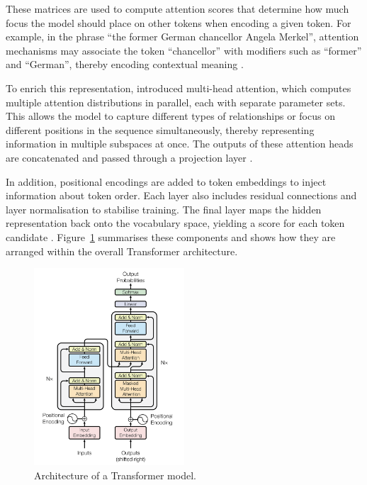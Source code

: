 \documentclass[a4paper,oneside,bibliography=totoc]{scrbook}
\begin{document}
These matrices are used to compute attention scores that determine how much focus the model should place on other tokens when encoding a given token. For example, in the phrase \enquote{the former German chancellor Angela Merkel}, attention mechanisms may associate the token \enquote{chancellor} with modifiers such as \enquote{former} and \enquote{German}, thereby encoding contextual meaning \cite{Sanderson2024}.

To enrich this representation, \citet{Vaswani2023} introduced multi-head attention, which computes multiple attention distributions in parallel, each with separate parameter sets. This allows the model to capture different types of relationships or focus on different positions in the sequence simultaneously, thereby representing information in multiple subspaces at once. The outputs of these attention heads are concatenated and passed through a projection layer \cite{Vaswani2023}.

In addition, positional encodings are added to token embeddings to inject information about token order. Each layer also includes residual connections and layer normalisation to stabilise training. The final layer maps the hidden representation back onto the vocabulary space, yielding a score for each token candidate \cite{Vaswani2023}. Figure~\ref{fig:transformer} summarises these components and shows how they are arranged within the overall Transformer architecture.

\begin{figure}[t]
  \centering
  \includegraphics[width=0.5\textwidth]{figures/Transformer.png}
  \caption[Architecture of a Transformer model]{Architecture of a Transformer model. \cite{Vaswani2023}}
  \label{fig:transformer}
\end{figure}
\end{document}
